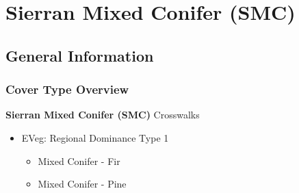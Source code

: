 \newpage
\section{Sierran Mixed Conifer (SMC)}

\subsection*{General Information}

\subsubsection{Cover Type Overview}

\textbf{Sierran Mixed Conifer (SMC)}
\newline
Crosswalks
\begin{itemize}
	\item EVeg: Regional Dominance Type 1
	\begin{itemize}
		\item Mixed Conifer - Fir
		\item Mixed Conifer - Pine
	\end{itemize}


\end{itemize}
